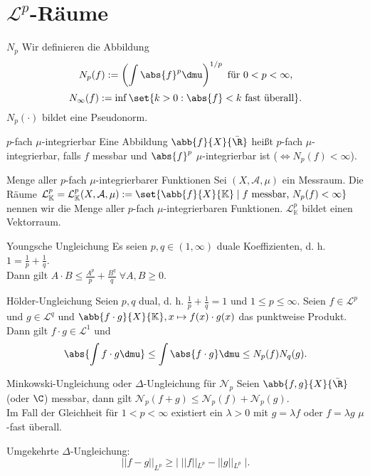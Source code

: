 \section*{\(\mathcal{L}^p\)-Räume}

\begin{karte}{\(N_p\)}
	Wir definieren die Abbildung 
	\[ N_p(f) := \left(\int \abs{f}^p \dmu\right)^{1/p} \text{ für } 0 < p < \infty, \]
	\[ N_\infty(f) := \inf \set{ k > 0 : \abs{f} < k \text{ fast überall} }. \]
	\(N_p(\cdot)\) bildet eine Pseudonorm.
\end{karte}

\begin{karte}{\(p\)-fach \(\mu\)-integrierbar}
	Eine Abbildung \( \abb{f}{X}{\bar{\R}} \) heißt \(p\)-fach \(\mu\)-integrierbar, falls 
	\(f\) messbar und \( \abs{f}^p \) \( \mu \)-integrierbar ist (\( \Leftrightarrow N_p(f) < \infty \)).
\end{karte}

\begin{karte}{Menge aller \(p\)-fach \(\mu\)-integrierbarer Funktionen}
	Sei \( (X, \mathcal{A}, \mu) \) ein Messraum. 
	Die Räume \( \mathcal{L}_\mathbb{K}^p 
	= \mathcal{L}_\mathbb{K}^p(X, \mathcal{A}, \mu) := \set{\abb{f}{X}{\mathbb{K}} \;|\; 
	f \text{ messbar, } N_p(f) < \infty } \) nennen wir die Menge aller \(p\)-fach \(\mu\)-integrierbaren Funktionen.
	\( \mathcal{L}_{\mathbb{K}}^p \) bildet einen Vektorraum.
\end{karte}

\begin{karte}{Youngsche Ungleichung}
	Es seien \( p,q\in (1,\infty) \) duale Koeffizienten, d. h. 
	\( 1 = \frac{1}{p} + \frac{1}{q} \). \\
	Dann gilt \( A \cdot B \leq \frac{A^p}{p} + \frac{B^q}{q} 
	\;\forall A,B\geq 0 \).
\end{karte}

\begin{karte}{Hölder-Ungleichung}
	Seien \(p, q\) dual, d. h. \(\frac{1}{p} + \frac{1}{q} = 1\) 
	und \( 1 \leq p \leq \infty \). 
	Seien \( f \in \mathcal{L}^p \) und 
	\( g \in \mathcal{L}^q \) und 
	\( \abb{f \cdot g}{X}{\mathbb{K}}, x \mapsto f(x) \cdot g(x) \) das punktweise Produkt.\\
	Dann gilt \( f\cdot g \in \mathcal{L}^1 \) und 
	\[ \abs{ \int f \cdot g \dmu } \leq \int \abs{f \cdot g} \dmu \leq N_p(f) N_q(g). \]
\end{karte}

\begin{karte}{Minkowski-Ungleichung oder \( \Delta \)-Ungleichung für \( \mathcal{N}_p \)}
	Seien \( \abb{f,g}{X}{\bar{\R}} \) (oder \(\C\)) messbar, dann gilt 
	\( \mathcal{N}_p(f+g) \leq \mathcal{N}_p(f) + \mathcal{N}_p(g) \).\\
	Im Fall der Gleichheit für \( 1 < p < \infty \) existiert ein \(\lambda > 0\) 
	mit \( g = \lambda f \) oder \( f = \lambda g \) \(\mu\)-fast überall.

	Umgekehrte \(\Delta\)-Ungleichung: \[ ||f-g||_{L^p} \geq |\; ||f||_{L^p} - ||g||_{L^p}\; |. \]
\end{karte}